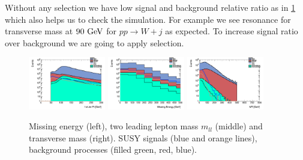 \documentclass[tightenline,notitlepage,nofootinbib]{revtex4-1}
\begin{document}
Without any selection we have low signal and background relative ratio as in \cref{fig:nocuts} which also helps us to check the simulation. For example we see resonance for transverse mass at $90~\rm{GeV}$ for $pp \to W +j$ as expected. To increase signal ratio over background we are going to apply selection.
\clearpage
\begin{figure}[!ht]
  \centering
  \includegraphics[width=0.3\textwidth]{h_PtJets1st.png}
  \includegraphics[width=0.3\textwidth]{h_MET.png}
  \includegraphics[width=0.3\textwidth]{h_MT.png}
  \caption{Missing energy (left), two leading lepton mass $m_{ll}$ (middle) and transverse mass (right). SUSY signals (blue and orange lines), background processes (filled green, red, blue). }
  \label{fig:nocuts}
\end{figure}
\end{document}
